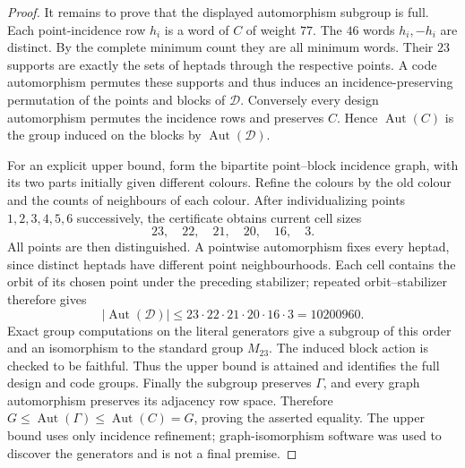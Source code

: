 \documentclass[11pt]{article}
\newcommand{\Aut}{\operatorname{Aut}}
\begin{document}
\begin{proof}
It remains to prove that the displayed automorphism subgroup is full.
Each point-incidence row $h_i$ is a word of $C$ of weight $77$.
The $46$ words $h_i,-h_i$ are distinct. By the complete minimum count
they are all minimum words. Their $23$ supports are exactly the sets of
heptads through the respective points. A code automorphism permutes these
supports and thus induces an incidence-preserving permutation of the
points and blocks of $\mathcal D$. Conversely every design automorphism
permutes the incidence rows and preserves $C$. Hence $\Aut(C)$ is the
group induced on the blocks by $\Aut(\mathcal D)$.

For an explicit upper bound, form the bipartite point--block incidence
graph, with its two parts initially given different colours. Refine the
colours by the old colour and the counts of neighbours of each colour.
After individualizing points $1,2,3,4,5,6$ successively, the certificate
obtains current cell sizes
\[
 23,\quad22,\quad21,\quad20,\quad16,\quad3.
\]
All points are then distinguished. A pointwise automorphism fixes every
heptad, since distinct heptads have different point neighbourhoods.
Each cell contains the orbit of its chosen point under the preceding
stabilizer; repeated orbit--stabilizer therefore gives
\[
 |\Aut(\mathcal D)|\leq23\cdot22\cdot21\cdot20\cdot16\cdot3=10200960.
\]
Exact group computations on the literal generators give a subgroup of
this order and an isomorphism to the standard group $M_{23}$.
The induced block action is checked to be faithful. Thus the upper bound
is attained and identifies the full design and code groups. Finally the
subgroup preserves $\Gamma$, and every graph automorphism preserves its
adjacency row space. Therefore
$G\leq\Aut(\Gamma)\leq\Aut(C)=G$, proving the asserted equality.
The upper bound uses only incidence refinement; graph-isomorphism
software was used to discover the generators and is not a final premise.
\end{proof}
\end{document}
